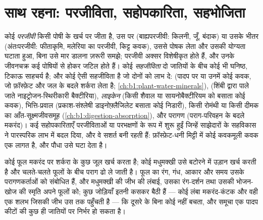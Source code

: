 \section{साथ रहना: परजीविता, सहोपकारिता, सहभोजिता}

\begin{definition}\label{def:b1:species-interactions:symbiosis}
कोई \emph{परजीवी} किसी पोषी के खर्च पर जीता है, उस पर (बाह्यपरजीवी:
किलनी, जूँ, बंदाक) या उसके भीतर (अंतःपरजीवी: फीताकृमि, मलेरिया का
परजीवी, किट्ट कवक), उससे पोषक लेता और उसकी योग्यता घटाता हुआ, बिना उसे
मार डालना ज़रूरी समझे; परजीवी अक्सर विशेषीकृत होते हैं, और उनके जीवनचक्र
कई पोषियों से होकर जटिल होते हैं। कोई \emph{सहजीविता} दो जातियों के बीच
कोई भी घनिष्ठ, टिकाऊ साहचर्य है; और कोई \emph{} ऐसी सहजीविता
है जो दोनों को लाभ दे:  (पादप  पर या उनमें कोई कवक, जो
फ़ॉस्फ़ेट और जल के बदले शर्करा लेता है;
\cref{ch:b1:plant-water-minerals}),  (शिंबी द्वारा पाले जाते
नाइट्रोजन-स्थिरीकारी बैक्टीरिया), \emph{लाइकेन} (किसी शैवाल या
सायनोबैक्टीरियम को बसाता कोई कवक), भित्ति-प्रवाल (प्रकाश-संश्लेषी
डाइनोफ़्लैजिलेट बसाता कोई निडारी), किसी रोमंथी या किसी दीमक का आँत-सूक्ष्मजीवसमूह
(\cref{ch:b1:digestion-absorption}), और परागण (पराग-परिवहन के बदले
मकरंद)। कई सहोपकारिताएँ परजीविताओं या परभक्षणों के रूप में शुरू हुईं
जिन्हें साझेदारों के सहविकास ने पारस्परिक लाभ में बदल दिया, और वे सशर्त
बनी रहती हैं: फ़ॉस्फ़ेट-धनी मिट्टी में कोई कवकमूली कवक एक लागत है, और
पौधा उसे घटा देता है।
\end{definition}

\begin{example}[एक सौदे के रूप में परागण]\label{ex:b1:species-interactions:pollination}
कोई फूल मकरंद पर शर्करा के कुछ जूल खर्च करता है; कोई मधुमक्खी उसे बटोरने
में उड़ान खर्च करती है और चलते-चलते फूलों के बीच पराग ढो ले जाती है।
फूल का रंग, गंध, आकार और समय उसके परागणकर्ताओं को संबोधित हैं, और
मधुमक्खी की जीभ की लंबाई, उसका रंग-दर्शन तथा उसकी भोजन-खोज की स्मृति
अपने फूलों को; कुछ जोड़ियाँ इतनी कसकर बैठी हैं --- कोई लंबा मकरंद-कंटक
और वही एक शलभ जिसकी जीभ उस तक पहुँचती है --- कि दूसरे के बिना कोई नहीं
बचता, और समूचा एक पादप  कीटों की कुछ ही जातियों पर निर्भर हो सकता
है।
\end{example}

